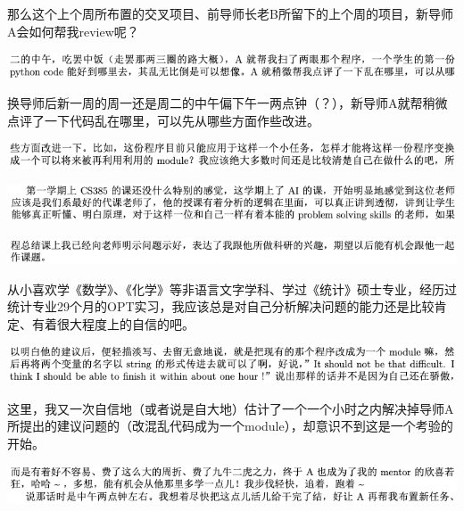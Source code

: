 \documentclass[9pt, b5paper]{article}
\begin{document}
那么这个上个周所布置的交叉项目、前导师长老B所留下的上个周的项目，新导师A会如何帮我review呢？

\begin{center}
\includegraphics[width=.9\linewidth]{./pic/backups_plans_20210511_110111.png}
\end{center}

换导师后新一周的周一还是周二的中午偏下午一两点钟（？），新导师A就帮稍微点评了一下代码乱在哪里，可以先从哪些方面作些改进。

\begin{center}
\includegraphics[width=.9\linewidth]{./pic/backups_plans_20210511_110130.png}
\end{center}

\begin{center}
\includegraphics[width=.9\linewidth]{./pic/backups_plans_20210511_110510.png}
\end{center}

\begin{center}
\includegraphics[width=.9\linewidth]{./pic/backups_plans_20210511_110559.png}
\end{center}

从小喜欢学《数学》、《化学》等非语言文字学科、学过《统计》硕士专业，经历过统计专业29个月的OPT实习，我应该总是对自己分析解决问题的能力还是比较肯定、有着很大程度上的自信的吧。 

\begin{center}
\includegraphics[width=.9\linewidth]{./pic/backups_plans_20210511_110329.png}
\end{center}

这里，我又一次自信地（或者说是自大地）估计了一个一个小时之内解决掉导师A所提出的建议问题的（改混乱代码成为一个module），却意识不到这是一个考验的开始。 

\begin{center}
\includegraphics[width=.9\linewidth]{./pic/backups_plans_20210511_111340.png}
\end{center}
\end{document}
